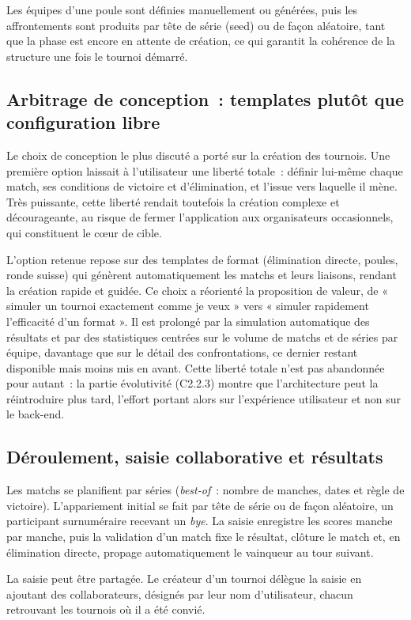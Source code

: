 Les équipes d'une poule sont définies manuellement ou générées, puis les affrontements sont produits par tête de série (seed) ou de façon aléatoire, tant que la phase est encore en attente de création, ce qui garantit la cohérence de la structure une fois le tournoi démarré.

\subsection{Arbitrage de conception~: templates plutôt que configuration libre}
Le choix de conception le plus discuté a porté sur la création des tournois. Une première option laissait à l'utilisateur une liberté totale~: définir lui-même chaque match, ses conditions de victoire et d'élimination, et l'issue vers laquelle il mène. Très puissante, cette liberté rendait toutefois la création complexe et décourageante, au risque de fermer l'application aux organisateurs occasionnels, qui constituent le cœur de cible.

L'option retenue repose sur des templates de format (élimination directe, poules, ronde suisse) qui génèrent automatiquement les matchs et leurs liaisons, rendant la création rapide et guidée. Ce choix a réorienté la proposition de valeur, de « simuler un tournoi exactement comme je veux » vers « simuler rapidement l'efficacité d'un format ». Il est prolongé par la simulation automatique des résultats et par des statistiques centrées sur le volume de matchs et de séries par équipe, davantage que sur le détail des confrontations, ce dernier restant disponible mais moins mis en avant. Cette liberté totale n'est pas abandonnée pour autant~: la partie évolutivité (C2.2.3) montre que l'architecture peut la réintroduire plus tard, l'effort portant alors sur l'expérience utilisateur et non sur le back-end.

\subsection{Déroulement, saisie collaborative et résultats}
Les matchs se planifient par séries (\emph{best-of}~: nombre de manches, dates et règle de victoire). L'appariement initial se fait par tête de série ou de façon aléatoire, un participant surnuméraire recevant un \emph{bye}. La saisie enregistre les scores manche par manche, puis la validation d'un match fixe le résultat, clôture le match et, en élimination directe, propage automatiquement le vainqueur au tour suivant.

La saisie peut être partagée. Le créateur d'un tournoi délègue la saisie en ajoutant des collaborateurs, désignés par leur nom d'utilisateur, chacun retrouvant les tournois où il a été convié.

